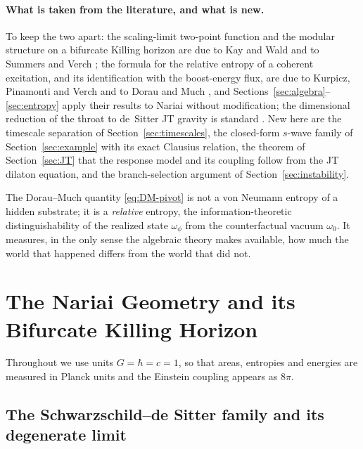 \documentclass[11pt]{article}
\newcommand{\Nariai}{Nariai}
\begin{document}
\paragraph{What is taken from the literature, and what is new.} To keep the two apart: the scaling-limit two-point function and the modular structure on a bifurcate Killing horizon are due to Kay and Wald \cite{KayWald} and to Summers and Verch \cite{SummersVerch}; the formula for the relative entropy of a coherent excitation, and its identification with the boost-energy flux, are due to Kurpicz, Pinamonti and Verch \cite{KPV} and to Dorau and Much \cite{DorauMuch}, and Sections~\ref{sec:algebra}--\ref{sec:entropy} apply their results to \Nariai{} without modification; the dimensional reduction of the throat to de~Sitter JT gravity is standard \cite{MertensTuriaci}. New here are the timescale separation of Section~\ref{sec:timescales}, the closed-form $s$-wave family of Section~\ref{sec:example} with its exact Clausius relation, the theorem of Section~\ref{sec:JT} that the response model and its coupling follow from the JT dilaton equation, and the branch-selection argument of Section~\ref{sec:instability}.

The Dorau--Much quantity \eqref{eq:DM-pivot} is not a von Neumann entropy of a hidden substrate; it is a \emph{relative} entropy, the information-theoretic distinguishability of the realized state $\omega_\phi$ from the counterfactual vacuum $\omega_0$. It measures, in the only sense the algebraic theory makes available, how
much the world that happened differs from the world that did not.


\section{The \Nariai{} Geometry and its Bifurcate Killing Horizon}
\label{sec:geometry}

Throughout we use units $G = \hbar = c = 1$, so that areas, entropies and energies are measured in Planck units and the Einstein coupling appears as $8\pi$.

\subsection{The Schwarzschild--de Sitter family and its degenerate limit}
\end{document}
